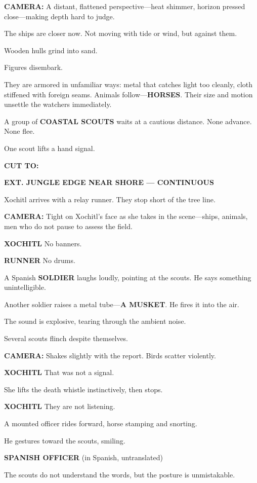 \documentclass[12pt]{article}
\begin{document}
\textbf{CAMERA:} A distant, flattened perspective—heat shimmer, horizon pressed close—making depth hard to judge.

The ships are closer now. Not moving with tide or wind, but against them.

Wooden hulls grind into sand.

Figures disembark.

They are armored in unfamiliar ways: metal that catches light too cleanly, cloth stiffened with foreign seams. Animals follow—\textbf{HORSES}. Their size and motion unsettle the watchers immediately.

A group of \textbf{COASTAL SCOUTS} waits at a cautious distance. None advance. None flee.

One scout lifts a hand signal.

\textbf{CUT TO:}

\textbf{EXT. JUNGLE EDGE NEAR SHORE — CONTINUOUS}

Xochitl arrives with a relay runner. They stop short of the tree line.

\textbf{CAMERA:} Tight on Xochitl’s face as she takes in the scene—ships, animals, men who do not pause to assess the field.

\textbf{XOCHITL}  
No banners.

\textbf{RUNNER}  
No drums.

A Spanish \textbf{SOLDIER} laughs loudly, pointing at the scouts. He says something unintelligible.

Another soldier raises a metal tube—\textbf{A MUSKET}. He fires it into the air.

The sound is explosive, tearing through the ambient noise.

Several scouts flinch despite themselves.

\textbf{CAMERA:} Shakes slightly with the report. Birds scatter violently.

\textbf{XOCHITL}  
That was not a signal.

She lifts the death whistle instinctively, then stops.

\textbf{XOCHITL}  
They are not listening.

A mounted officer rides forward, horse stamping and snorting.

He gestures toward the scouts, smiling.

\textbf{SPANISH OFFICER}  
(in Spanish, untranslated)

The scouts do not understand the words, but the posture is unmistakable.
\end{document}
